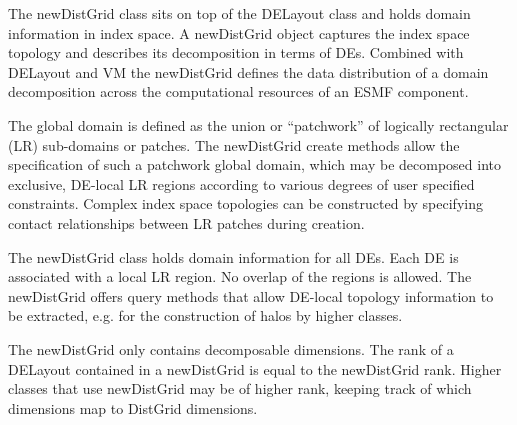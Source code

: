 
The newDistGrid class sits on top of the DELayout class and holds domain information in index space. A newDistGrid object captures the index space topology and describes its decomposition in terms of DEs. Combined with DELayout and VM the newDistGrid defines the data distribution of a domain decomposition across the computational resources of an ESMF component.

The global domain is defined as the union or ``patchwork'' of logically rectangular (LR) sub-domains or patches. The newDistGrid create methods allow the specification of such a patchwork global domain, which may be decomposed into exclusive, DE-local LR regions according to various degrees of user specified constraints. Complex index space topologies can be constructed by specifying contact relationships between LR patches during creation. 

The newDistGrid class holds domain information for all DEs. Each DE is associated with a local LR region. No overlap of the regions is allowed. The newDistGrid offers query methods that allow DE-local topology information to be extracted, e.g. for the construction of halos by higher classes.

The newDistGrid only contains decomposable dimensions. The rank of a DELayout contained in a newDistGrid is equal to the newDistGrid rank. Higher classes that use newDistGrid may be of higher rank, keeping track of which dimensions map to DistGrid dimensions.
